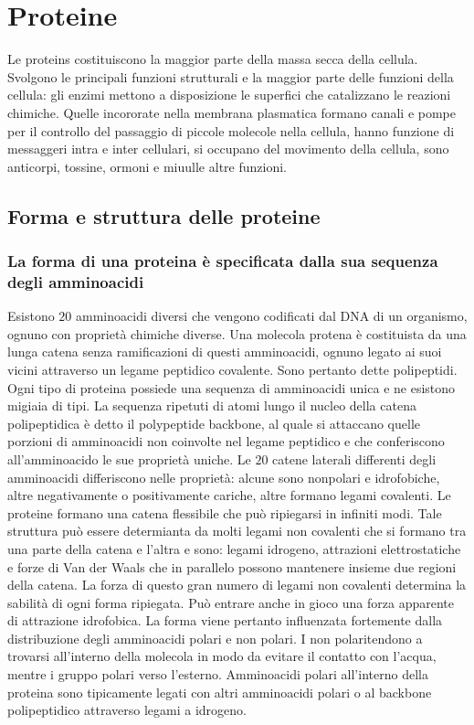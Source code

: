 \chapter{Proteine}
Le proteins costituiscono la maggior parte della massa secca della cellula. Svolgono le principali funzioni strutturali e la maggior parte delle funzioni
della cellula: gli enzimi mettono a disposizione le superfici che catalizzano le reazioni chimiche. Quelle incororate nella membrana plasmatica formano 
canali e pompe per il controllo del passaggio di piccole molecole nella cellula, hanno funzione di messaggeri intra e inter cellulari, si occupano del
movimento della cellula, sono anticorpi, tossine, ormoni e miuulle altre funzioni. 
\section{Forma e struttura delle proteine}
\subsection{La forma di una proteina \`e specificata dalla sua sequenza degli amminoacidi}
Esistono $20$ amminoacidi diversi che vengono codificati dal DNA di un organismo, ognuno con propriet\`a chimiche diverse. Una molecola protena \`e
costituista da una lunga catena senza ramificazioni di questi amminoacidi, ognuno legato ai suoi vicini attraverso un legame peptidico covalente. Sono
pertanto dette polipeptidi. Ogni tipo di proteina possiede una sequenza di amminoacidi unica e ne esistono migiaia di tipi. La sequenza ripetuti di atomi 
lungo il nucleo della catena polipeptidica \`e detto il polypeptide backbone, al quale si attaccano quelle porzioni di amminoacidi non coinvolte nel 
legame peptidico e che conferiscono all'amminoacido le sue propriet\`a uniche. Le $20$ catene laterali differenti degli amminoacidi differiscono nelle
propriet\`a: alcune sono nonpolari e idrofobiche, altre negativamente o positivamente cariche, altre formano legami covalenti. Le proteine formano una 
catena flessibile che pu\`o ripiegarsi in infiniti modi. Tale struttura pu\`o essere determianta da molti legami non covalenti che si formano tra una 
parte della catena e l'altra e sono: legami idrogeno, attrazioni elettrostatiche e forze di Van der Waals che in parallelo possono mantenere insieme due 
regioni della catena. La forza di questo gran numero di legami non covalenti determina la sabilit\`a di ogni forma ripiegata. Pu\`o entrare anche in gioco
una forza apparente di attrazione idrofobica. La forma viene pertanto influenzata fortemente dalla distribuzione degli amminoacidi polari e non polari. I 
non polaritendono a trovarsi all'interno della molecola in modo da evitare il contatto con l'acqua, mentre i gruppo polari verso l'esterno. Amminoacidi
polari all'interno della proteina sono tipicamente legati con altri amminoacidi polari o al backbone polipeptidico attraverso legami a idrogeno.
